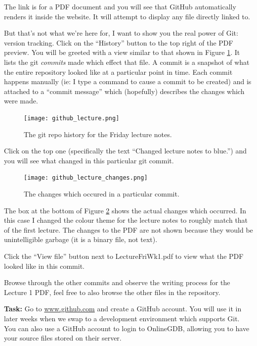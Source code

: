 \documentclass{lab}
\begin{document}
The link is for a PDF document and you will see that GitHub automatically renders it inside the website. It will attempt to display any file directly linked to.

But that's not what we're here for, I want to show you the real power of Git: version tracking. Click on the ``History'' button to the top right of the PDF preview. You will be greeted with a view similar to that shown in Figure \ref{fig:githistory}. It lists the git \textit{commits} made which effect that file. A commit is a snapshot of what the entire repository looked like at a particular point in time. Each commit happens manually (ie: I type a command to cause a commit to be created) and is attached to a ``commit message'' which (hopefully) describes the changes which were made.

\begin{figure}[H]
\begin{center}
\texttt{[image: github\_lecture.png]}
\end{center}
\caption{The git repo history for the Friday lecture notes.}\label{fig:githistory}
\end{figure}

Click on the top one (specifically the text ``Changed lecture notes to blue.'') and you will see what changed in this particular git commit.

\begin{figure}[H]
\begin{center}
\texttt{[image: github\_lecture\_changes.png]}
\end{center}
\caption{The changes which occured in a particular commit.}\label{fig:gitchanges}
\end{figure}

The box at the bottom of Figure \ref{fig:gitchanges} shows the actual changes which occurred. In this case I changed the colour theme for the lecture notes to roughly match that of the first lecture. The changes to the PDF are not shown because they would be unintelligible garbage (it is a binary file, not text).

Click the ``View file'' button next to LectureFriWk1.pdf to view what the PDF looked like in this commit.

Browse through the other commits and observe the writing process for the Lecture 1 PDF, feel free to also browse the other files in the repository.

\textbf{Task:} Go to \url{www.github.com} and create a GitHub account. You will use it in later weeks when we swap to a development environment which supports Git. You can also use a GitHub account to login to OnlineGDB, allowing you to have your source files stored on their server.
\end{document}
